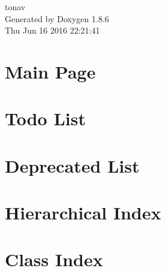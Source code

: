 \documentclass[twoside]{book}
\newcommand{\clearemptydoublepage}{%
  \newpage{\pagestyle{empty}\cleardoublepage}%
}
\begin{document}
\hypersetup{pageanchor=false}
\begin{titlepage}
\vspace*{7cm}
\begin{center}%
{\Large tonav }\\
\vspace*{1cm}
{\large Generated by Doxygen 1.8.6}\\
\vspace*{0.5cm}
{\small Thu Jun 16 2016 22:21:41}\\
\end{center}
\end{titlepage}
\clearemptydoublepage
\tableofcontents
\clearemptydoublepage
{}
\hypersetup{pageanchor=true}

\chapter{Main Page}
\label{index}\hypertarget{index}{}
\chapter{Todo List}
\label{todo}
\hypertarget{todo}{}

\chapter{Deprecated List}
\label{deprecated}
\hypertarget{deprecated}{}

\chapter{Hierarchical Index}

\chapter{Class Index}

\end{document}
